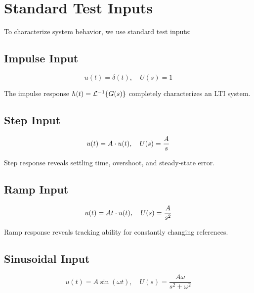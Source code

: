 \section{Standard Test Inputs}
\label{sec:test_inputs}

To characterize system behavior, we use standard test inputs:

\subsection{Impulse Input}

\begin{equation}
u(t) = \delta(t), \quad U(s) = 1
\end{equation}

The impulse response $h(t) = \mathcal{L}^{-1}\{G(s)\}$ completely characterizes an LTI system.

\subsection{Step Input}

\begin{equation}
u(t) = A \cdot u(t), \quad U(s) = \frac{A}{s}
\end{equation}

Step response reveals settling time, overshoot, and steady-state error.

\subsection{Ramp Input}

\begin{equation}
u(t) = At \cdot u(t), \quad U(s) = \frac{A}{s^2}
\end{equation}

Ramp response reveals tracking ability for constantly changing references.

\subsection{Sinusoidal Input}

\begin{equation}
u(t) = A\sin(\omega t), \quad U(s) = \frac{A\omega}{s^2 + \omega^2}
\end{equation}

